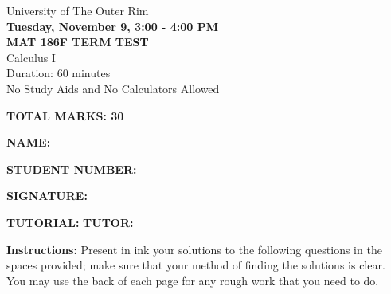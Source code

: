 \documentclass[11pt]{article}
\begin{document}
\begin{center}

University of The Outer Rim \\

{\bf Tuesday, November 9, 3:00 - 4:00 PM} \\

{\bf MAT 186F TERM TEST} \\

Calculus I \\

Duration: 60 minutes \\

No Study Aids and No Calculators Allowed

\end{center}







\vspace{0.25cm}



{\bf TOTAL MARKS: 30}



\vspace{1cm}



{\bf NAME:} \hfill \underline{\hspace{3.5in}}



\vspace{1cm}



{\bf STUDENT NUMBER:} \hfill \underline{\hspace{3.5in}}



\vspace{1cm}



{\bf SIGNATURE:} \hfill \underline{\hspace{3.5in}}



\vspace{1cm}



{\bf TUTORIAL:} \underline{\hspace{1in}} \hfill {\bf TUTOR:} \underline{\hspace{
2in}}

\vspace{1cm}



{\bf Instructions:} Present in ink your solutions to the following questions in
the spaces provided; make sure that your method of finding the solutions is clear. You may use the back of each page for any rough
work that you need to do.
\end{document}

